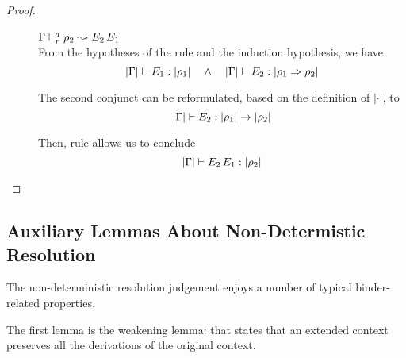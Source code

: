 \begin{proof}
\begin{description}
\item[]\quad$\Gamma \vdash^a_{r} \rho_2 \leadsto E_2\,E_1$ \ \\

  From the hypotheses of the rule and the induction hypothesis, we have
\begin{equation*}
  |\Gamma| \vdash E_1 : |\rho_1| \quad\wedge\quad
  |\Gamma| \vdash E_2 : |\rho_1 \Rightarrow \rho_2|
\end{equation*}

  The second conjunct can be reformulated, based on the definition of $|\cdot|$, to
\begin{equation*}
  |\Gamma| \vdash E_2 : |\rho_1| \rightarrow |\rho_2|
\end{equation*}

  Then, rule  allows us to conclude
\begin{equation*}
  |\Gamma| \vdash E_2\,E_1 : |\rho_2|
\end{equation*}

\end{description}
\end{proof}


\subsection{Auxiliary Lemmas About Non-Determistic Resolution}

The non-deterministic resolution judgement enjoys a number of
typical binder-related properties.

The first lemma is the weakening lemma: that states that an extended context
preserves all the derivations of the original context.

{\centering
{}}

